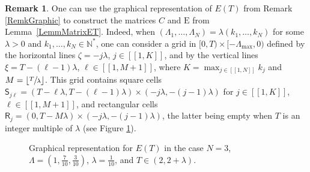 \documentclass[JEP,XML,SOM,Unicode]{cedram}
\newcommand{\llbracket}{[\![}
\newcommand{\rrbracket}{]\!]}
\theoremstyle{plain}
\theoremstyle{definition}
\newtheorem{remk}[theo]{Remark}
\newcommand{\floor}[1]{\left\lfloor #1 \right\rfloor}
\newcommand{\Epsilon}{\mathrm E}
\begin{document}
\begin{remk}
\label{RemkGraphCommens}
One can use the graphical representation of $E(T)$ from Remark \ref{RemkGraphic} to construct the matrices $C$ and $\Epsilon$ from Lemma~\ref{LemmMatrixET}. Indeed, when $(\Lambda_1, \dots, \Lambda_N) = \lambda (k_1, \dots, k_N)$ for some $\lambda > 0$ and $k_1, \dots, k_N \in \mathbb N^\ast$, one can consider a grid in $[0, T) \times [-\Lambda_{\max}, 0)$ defined by the horizontal lines $\zeta = -j\lambda$, $j \in \llbracket 1, K\rrbracket$, and by the vertical lines $\xi = T - (\ell - 1)\lambda$, $\ell \in \llbracket 1, M+1\rrbracket$, where $K = \max_{j \in \llbracket 1, N\rrbracket} k_j$ and $M = \floor{\sfrac{T}{\lambda}}$. This grid contains square cells $\mathsf S_{j\ell} = (T - \ell\lambda, T - (\ell - 1)\lambda) \times (-j\lambda, -(j-1)\lambda)$ for $j \in \llbracket 1, K\rrbracket$, $\ell \in \llbracket 1, M+1\rrbracket$, and rectangular cells $\mathsf R_j = (0, T - M\lambda) \times (-j\lambda, -(j-1)\lambda)$, the latter being empty when $T$ is an integer multiple of $\lambda$ (see Figure \ref{FigETMatrix}).

\begin{figure}[ht]
\centering

\caption{Graphical representation for $E(T)$ in the case $N = 3$, $\Lambda = \left(1, \frac{7}{10}, \frac{3}{10}\right)$, $\lambda = \frac{1}{10}$, and $T \in (2, 2 + \lambda)$.}
\label{FigETMatrix}
\end{figure}


\end{remk}
\end{document}
